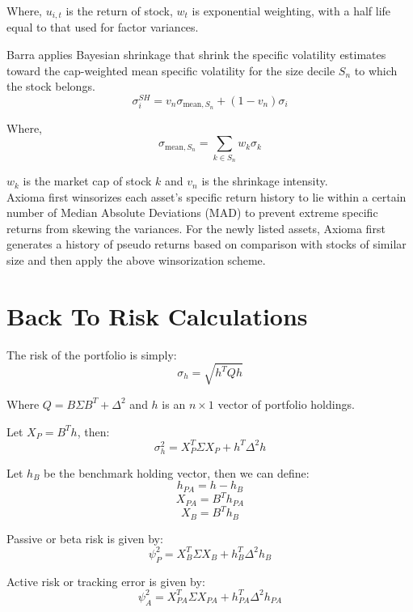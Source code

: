 \documentclass{article}
\begin{document}
Where, 
$u_{i,t}$ is the return of stock,
$w_t$ is exponential weighting, with a half life equal to that used for factor variances.

Barra applies Bayesian shrinkage that shrink the specific volatility estimates toward the cap-weighted mean specific volatility for the size decile \( S_n \) to which the stock belongs.
\begin{equation}
\sigma_i^{SH} = v_n \sigma_{\text{mean}, S_n} + (1 - v_n) \sigma_i
\end{equation}

Where, 
\begin{equation}
\sigma_{\text{mean}, S_n} = \sum_{k \in S_n} w_k \sigma_k
\end{equation}

\( w_k \) is the market cap of stock \( k \) and \( v_n \) is the shrinkage intensity. \\

Axioma first winsorizes each asset's specific return history to lie within a certain number of Median Absolute Deviations (MAD) to prevent extreme specific returns from skewing the variances. For the newly listed assets, Axioma first generates a history of pseudo returns based on comparison with stocks of similar size and then apply the above winsorization scheme.

\section*{Back To Risk Calculations}
The risk of the portfolio is simply:
\begin{equation}
\sigma_h = \sqrt{h^T Q h}
\end{equation}

Where \( Q = B \Sigma B^T + \Delta^2 \) and \( h \) is an \( n \times 1 \) vector of portfolio holdings.

Let \( X_P = B^T h \), then:
\begin{equation}
\sigma_h^2 = X_P^T \Sigma X_P + h^T \Delta^2 h
\end{equation}

Let \( h_B \) be the benchmark holding vector, then we can define:
\begin{equation}
h_{PA} = h - h_B
\end{equation}
\begin{equation}
X_{PA} = B^T h_{PA}
\end{equation}
\begin{equation}
X_B = B^T h_B
\end{equation}

Passive or beta risk is given by:
\begin{equation}
\psi_P^2 = X_B^T \Sigma X_B + h_B^T \Delta^2 h_B
\end{equation}

Active risk or tracking error is given by:
\begin{equation}
\psi_A^2 = X_{PA}^T \Sigma X_{PA} + h_{PA}^T \Delta^2 h_{PA}
\end{equation}
\end{document}

